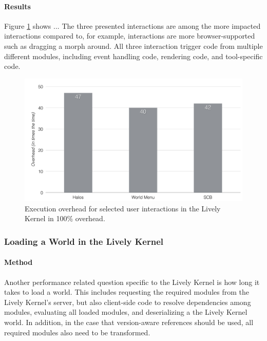 \paragraph{Results}
Figure \ref{fig:LivelyInteractionsOverhead} shows ...
The three presented interactions are among the more impacted interactions compared to, for example, interactions are more browser-supported such as dragging a morph around.
All three interaction trigger code from multiple different modules, including event handling code, rendering code, and tool-specific code.

\begin{figure}[h]
    \centering
    \includegraphics[width=\textwidth]{figures/6_evaluation/4_LivelyInteractionsOverhead.pdf}
    \caption{Execution overhead for selected user interactions in the Lively Kernel in 100\% overhead.}
    \label{fig:LivelyInteractionsOverhead}
\end{figure}


\subsubsection{Loading a World in the Lively Kernel}

\paragraph{Method}
Another performance related question specific to the Lively Kernel is how long it takes to load a world.
This includes requesting the required modules from the Lively Kernel's server, but also client-side code to resolve dependencies among modules, evaluating all loaded modules, and deserializing a the Lively Kernel world.
In addition, in the case that version-aware references should be used, all required modules also need to be transformed.

